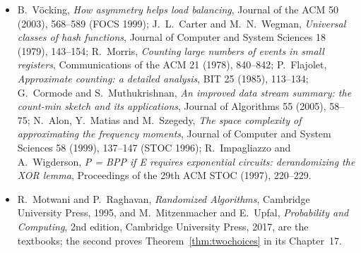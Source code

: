 \begin{itemize}
V.~Kabanets and R.~Impagliazzo, \emph{Derandomizing polynomial identity tests means proving circuit lower bounds}, Computational Complexity 13 (2004), 1--46.
\item B.~V\"ocking, \emph{How asymmetry helps load balancing}, Journal of the ACM 50 (2003), 568--589 (FOCS 1999); J.~L.~Carter and M.~N.~Wegman, \emph{Universal classes of hash functions}, Journal of Computer and System Sciences 18 (1979), 143--154; R.~Morris, \emph{Counting large numbers of events in small registers}, Communications of the ACM 21 (1978), 840--842;
P.~Flajolet, \emph{Approximate counting: a detailed analysis}, BIT 25 (1985), 113--134; G.~Cormode and S.~Muthukrishnan, \emph{An improved data stream summary: the count-min sketch and its applications}, Journal of Algorithms 55 (2005), 58--75; N.~Alon, Y.~Matias and M.~Szegedy, \emph{The space complexity of approximating the frequency moments},
Journal of Computer and System Sciences 58 (1999), 137--147 (STOC 1996); R.~Impagliazzo and A.~Wigderson, \emph{P = BPP if E requires exponential circuits: derandomizing the XOR lemma}, Proceedings of the 29th ACM STOC (1997), 220--229.
\item R.~Motwani and P.~Raghavan, \emph{Randomized Algorithms}, Cambridge University Press, 1995, and M.~Mitzenmacher and E.~Upfal, \emph{Probability and Computing}, 2nd edition, Cambridge University Press, 2017, are the textbooks; the second proves Theorem~\ref{thm:twochoices} in its Chapter~17.
\end{itemize}
